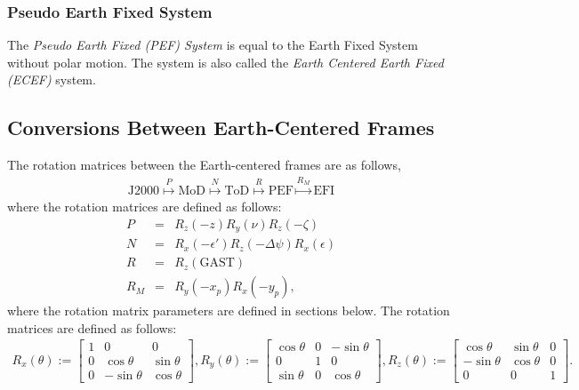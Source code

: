 \documentclass [12pt, a4paper] {article}
\begin{document}
\subsubsection{Pseudo Earth Fixed System}
The \emph{Pseudo Earth Fixed (PEF) System} is equal to the Earth Fixed System without polar motion.
The system is also called the \emph{Earth Centered Earth Fixed (ECEF)} system.

\subsection{Conversions Between Earth-Centered Frames}
The rotation matrices between the Earth-centered frames are as follows,
\begin {eqnarray}
  \textrm{J2000}
  \overset{P}{\mapsto}
  \textrm{MoD}
  \overset{N}{\mapsto}
  \textrm{ToD}
  \overset{R}{\mapsto}
  \textrm{PEF}
  \overset{R_M}{\mapsto}
  \textrm{EFI}
\end {eqnarray}
where the rotation matrices are defined as follows:
\begin {eqnarray}
  P &=& R_z(-z)R_y(\nu)R_z(-\zeta) \\
  N &=& R_x(-\epsilon')R_z(-\Delta\psi)R_x(\epsilon) \\
  R &=& R_z(\textrm{GAST}) \\
  R_M &=& R_y(-x_p) R_x(-y_p),
\end {eqnarray}
where the rotation matrix parameters are defined in sections below. The rotation matrices
are defined as follows:
\begin {eqnarray}
  R_x(\theta) := 
  \begin {bmatrix}
    1 & 0 & 0 \\
    0 & \cos\theta & \sin\theta \\
    0 & -\sin\theta & \cos\theta 
  \end {bmatrix}
  ,
  R_y(\theta) := 
  \begin {bmatrix}
    \cos\theta & 0 & - \sin\theta \\
    0 & 1 & 0 \\
    \sin\theta & 0 & \cos\theta 
  \end {bmatrix}
  ,
  R_z(\theta) := 
  \begin {bmatrix}
    \cos\theta & \sin\theta & 0 \\
    -\sin\theta & \cos\theta & 0 \\
    0 & 0 & 1
  \end {bmatrix}.
\end {eqnarray}
\end{document}
